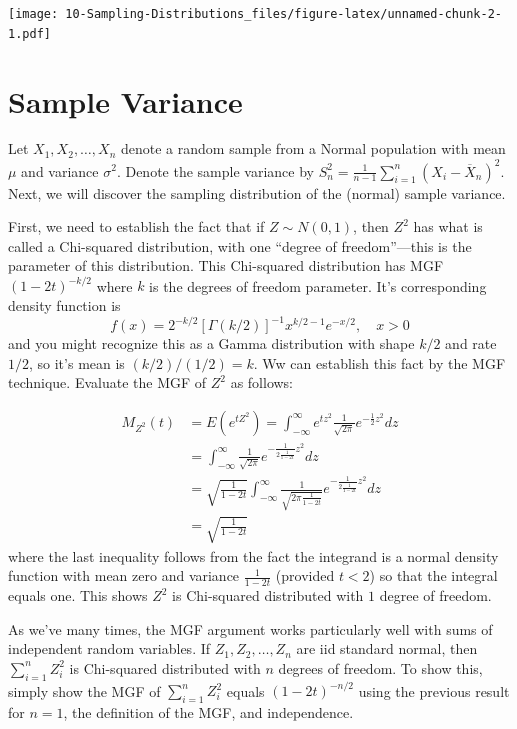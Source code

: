 \documentclass[
]{book}
\begin{document}
\texttt{[image: 10-Sampling-Distributions\_files/figure-latex/unnamed-chunk-2-1.pdf]}

\hypertarget{sample-variance}{%
\section{Sample Variance}\label{sample-variance}}

Let \(X_1, X_2, \ldots, X_n\) denote a random sample from a Normal population with mean \(\mu\) and variance \(\sigma^2\). Denote the sample variance by \(S^2_n = \frac{1}{n-1}\sum_{i=1}^n (X_i - \overline X_n)^2\). Next, we will discover the sampling distribution of the (normal) sample variance.

First, we need to establish the fact that if \(Z\sim N(0,1)\), then \(Z^2\) has what is called a Chi-squared distribution, with one ``degree of freedom''---this is the parameter of this distribution. This Chi-squared distribution has MGF \(\left(1-2t\right)^{-k/2}\) where \(k\) is the degrees of freedom parameter. It's corresponding density function is
\[f(x) = 2^{-k/2}\left[\Gamma(k/2)\right]^{-1}x^{k/2-1}e^{-x/2},\quad x>0\]
and you might recognize this as a Gamma distribution with shape \(k/2\) and rate \(1/2\), so it's mean is \((k/2)/(1/2) = k\). Ww can establish this fact by the MGF technique. Evaluate the MGF of \(Z^2\) as follows:

\begin{align*}
M_{Z^2}(t) &= E(e^{tZ^2}) = \int_{-\infty}^{\infty} e^{tz^2}\frac{1}{\sqrt{2\pi}}e^{-\tfrac12 z^2}dz\\
& = \int_{-\infty}^{\infty} \frac{1}{\sqrt{2\pi}} e^{-\frac{1}{2\frac{1}{1-2t}}z^2}dz\\
& = \sqrt{\frac{1}{1-2t}}\int_{-\infty}^{\infty} \frac{1}{\sqrt{2\pi\frac{1}{1-2t}}} e^{-\frac{1}{2\frac{1}{1-2t}}z^2}dz\\
& = \sqrt{\frac{1}{1-2t}}
\end{align*}
where the last inequality follows from the fact the integrand is a normal density function with mean zero and variance \(\frac{1}{1-2t}\) (provided \(t<2\)) so that the integral equals one. This shows \(Z^2\) is Chi-squared distributed with \(1\) degree of freedom.

As we've many times, the MGF argument works particularly well with sums of independent random variables. If \(Z_1, Z_2, \ldots, Z_n\) are iid standard normal, then \(\sum_{i=1}^n Z_i^2\) is Chi-squared distributed with \(n\) degrees of freedom. To show this, simply show the MGF of \(\sum_{i=1}^n Z_i^2\) equals \(\left(1-2t\right)^{-n/2}\) using the previous result for \(n=1\), the definition of the MGF, and independence.
\end{document}
